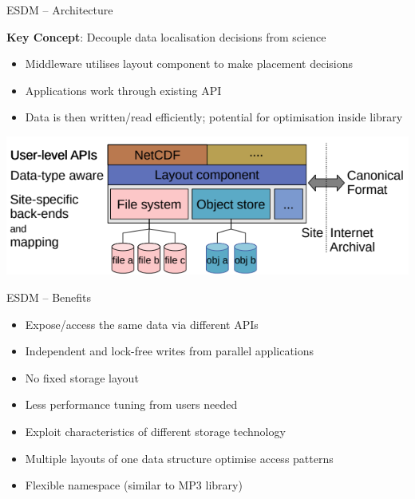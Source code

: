 \documentclass[compress,11pt,xcolor=svgnames,aspectratio=169]{beamer}
\begin{document}
\begin{frame}[fragile]{ESDM -- Architecture}

\begin{block}{\textbf{Key Concept}: Decouple data localisation decisions from science}
\begin{itemize}
\setlength\itemsep{0.2cm}
  \item Middleware utilises layout component to make placement decisions
  \item Applications work through existing API
  \item Data is then written/read efficiently; potential for optimisation inside library
\end{itemize}
\end{block}

\begin{center}
\includegraphics[scale=0.6]{fig/esdm-arch}
\end{center}

\end{frame}

\begin{frame}[fragile]{ESDM -- Benefits}

\begin{itemize}
\setlength\itemsep{0.4cm}
  \item Expose/access the same data via different APIs
  \item Independent and lock-free writes from parallel applications
  \item No fixed storage layout
  \item Less performance tuning from users needed
  \item Exploit characteristics of different storage technology
  \item Multiple layouts of one data structure optimise access patterns
  \item Flexible namespace (similar to MP3 library)
\end{itemize}

\end{frame}
\end{document}

